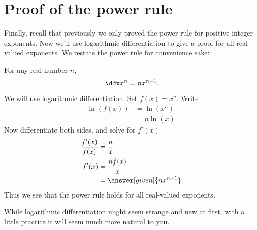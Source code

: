\documentclass{ximera}
\begin{document}
\section{Proof of the power rule}


Finally, recall that previously we only proved the power rule for
positive integer exponents. Now we'll use logarithmic differentiation to give
a proof for all real-valued exponents. We restate the power rule
for convenience sake:

\begin{theorem}
For any real number $n$, 
\[
\ddx x^n = n x^{n-1}.
\]
\begin{explanation}
We will use logarithmic differentiation. Set $f(x) = x^n$. Write
\begin{align*}
\ln(f(x)) &= \ln\left(x^n\right) \\ 
&= n\ln(x).
\end{align*}
Now differentiate both sides, and solve for $f'(x)$
\begin{align*}
\frac{f'(x)}{f(x)} &= \frac{n}{x}\\
f'(x) &=\frac{n f(x)}{x}\\
&= \answer[given]{n x^{n-1}}.
\end{align*}
Thus we see that the power rule holds for all real-valued exponents.
\end{explanation}
\end{theorem}

While logarithmic differentiation might seem strange and new at
first, with a little practice it will seem much more natural to you.
\end{document}
